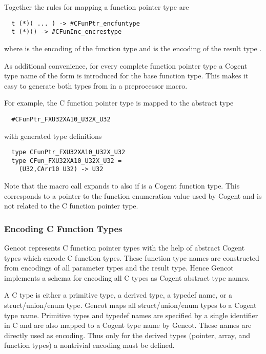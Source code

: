 Together the rules for mapping a function pointer type are
\begin{verbatim}
  t (*)( ... ) -> #CFunPtr_encfuntype
  t (*)() -> #CFunInc_encrestype
\end{verbatim}
where  is the encoding of the function type  
and  is the encoding of the result type .

As additional convenience, for every complete function pointer type a Cogent type name of the form 
is introduced for the base function type. This makes it easy to generate both types from  in a preprocessor
macro.

For example, the C function pointer type  is mapped to the abstract type
\begin{verbatim}
  #CFunPtr_FXU32XA10_U32X_U32
\end{verbatim}
with generated type definitions
\begin{verbatim}
  type CFunPtr_FXU32XA10_U32X_U32
  type CFun_FXU32XA10_U32X_U32 =
    (U32,CArr10 U32) -> U32
\end{verbatim}

Note that the macro call  expands to  also if  is a Cogent function type.
This corresponds to a pointer to the function enumeration value used by Cogent and is not related to the C
function pointer type.

\subsubsection{Encoding C Function Types}

Gencot represents C function pointer types with the help of abstract Cogent types which encode C function types. These
function type names are constructed from encodings of all parameter types and the result type. Hence Gencot implements
a schema for encoding all C types as Cogent abstract type names.

A C type is either a primitive type, a derived type, a typedef name, or a struct/union/enum type. Gencot maps all
struct/union/enum types to a Cogent type name. Primitive types and typedef names are specified by a single identifier
in C and are also mapped to a Cogent type name by Gencot. These names are directly used as encoding. Thus only for the 
derived types (pointer, array, and function types) a nontrivial encoding must be defined.

